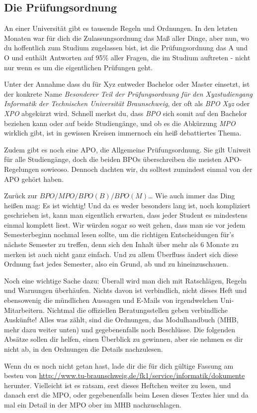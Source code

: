 \begin{multicols}{2}
\subsection{Die Prüfungsordnung}
\label{po}
	An einer Universität gibt es tausende Regeln und Ordnungen. In den letzten Monaten war für dich die Zulassungsordnung das Maß aller Dinge, aber nun, wo du hoffentlich zum Studium zugelassen bist, ist die Prüfungsordnung das A und O und enthält Antworten auf 95\% aller Fragen, die im Studium auftreten - nicht nur wenn es um die eigentlichen Prüfungen geht. 

	Unter der Annahme dass du für Xyz entweder Bachelor oder Master einsetzt, ist der konkrete Name \emph{Besonderer Teil der Prüfungsordnung für den Xyzstudiengang Informatik der Technischen Universität Braunschweig}, der oft als \emph{BPO Xyz} oder \emph{XPO} abgekürzt wird. Schnell merkst du, dass \emph{BPO} sich somit auf den Bachelor beziehen kann oder auf beide Studiengänge, und ob es die Abkürzung \emph{MPO} wirklich gibt, ist in gewissen Kreisen immernoch ein heiß debattiertes Thema.

	Zudem gibt es noch eine APO, die Allgemeine Prüfungsordnung. Sie gilt Uniweit für alle Studiengänge, doch die beiden BPOs überschreiben die meisten APO-Regelungen sowieoso. Dennoch dachten wir, du solltest zumindest einmal von der APO gehört haben.

	Zurück zur $BPO/MPO/BPO(B)/BPO(M)$\ldots{} Wie auch immer das Ding heißen mag: Es ist wichtig! Und da es weder besonders lang ist, noch kompliziert geschrieben ist, kann man eigentlich erwarten, dass jeder Student es mindestens einmal komplett liest. Wir würden sogar so weit gehen, dass man sie vor jedem Semesterbeginn nochmal lesen sollte, um die richtigen Entscheidungen für's nächste Semester zu treffen, denn sich den Inhalt über mehr als 6 Monate zu merken ist auch nicht ganz einfach. Und zu allem Überfluss ändert sich diese Ordnung fast jedes Semester, also ein Grund, ab und zu hineinzuschauen.

	Noch eine wichtige Sache dazu: Überall wird man dich mit Ratschlägen, Regeln und Warnungen überhäufen. Nichts davon ist verbindlich, nicht dieses Heft und ebensowenig die mündlichen Aussagen und E-Mails von irgendwelchen Uni-Mitarbeitern. Nichtmal die offiziellen Beratungsstellen geben verbindliche Auskünfte! Alles was zählt, sind die Ordnungen, das Modulhandbuch (MHB, mehr dazu weiter unten) und gegebenenfalls noch Beschlüsse. Die folgenden Absätze sollen dir helfen, einen Überblick zu gewinnen, aber sie nehmen es dir nicht ab, in den Ordnungen die Details nachzulesen.

	Wenn du es noch nicht getan hast, lade dir die für dich gültige Fassung am besten von \url{http://www.tu-braunschweig.de/fk1/service/informatik/dokumente} herunter. Vielleicht ist es ratsam, erst dieses Heftchen weiter zu lesen, und danach erst die MPO, oder gegebenenfalls beim Lesen dieses Textes hier und da mal ein Detail in der MPO ober im MHB nachzuschlagen.
\end{multicols}


